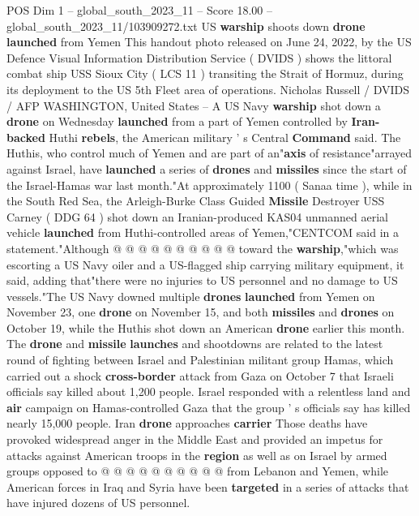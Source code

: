 \begin{textsample}{POS Dim 1 – global\_south\_2023\_11 – Score 18.00 – global\_south\_2023\_11/103909272.txt}  \label{ex:f1_pos_230}
US \textbf{warship} shoots down \textbf{drone} \textbf{launched} from Yemen This handout photo released on June 24, 2022, by the US Defence Visual Information Distribution Service ( DVIDS ) shows the littoral combat ship USS Sioux City ( LCS 11 ) transiting the Strait of Hormuz, during its deployment to the US 5th Fleet area of operations.
Nicholas Russell / DVIDS / AFP WASHINGTON, United States -- A US Navy \textbf{warship} shot down a \textbf{drone} on Wednesday \textbf{launched} from a part of Yemen controlled by \textbf{Iran-backed} Huthi \textbf{rebels}, the American military ' s Central \textbf{Command} said.
The Huthis, who control much of Yemen and are part of an"\textbf{axis} of resistance"arrayed against Israel, have \textbf{launched} a series of \textbf{drones} and \textbf{missiles} since the start of the Israel-Hamas war last month."At approximately 1100 ( Sanaa time ), while in the South Red Sea, the Arleigh-Burke Class Guided \textbf{Missile} Destroyer USS Carney ( DDG 64 ) shot down an Iranian-produced KAS04 unmanned aerial vehicle \textbf{launched} from Huthi-controlled areas of Yemen,"CENTCOM said in a statement."Although @ @ @ @ @ @ @ @ @ @ toward the \textbf{warship},"which was escorting a US Navy oiler and a US-flagged ship carrying military equipment, it said, adding that"there were no injuries to US personnel and no damage to US vessels."The US Navy downed multiple \textbf{drones} \textbf{launched} from Yemen on November 23, one \textbf{drone} on November 15, and both \textbf{missiles} and \textbf{drones} on October 19, while the Huthis shot down an American \textbf{drone} earlier this month.
The \textbf{drone} and \textbf{missile} \textbf{launches} and shootdowns are related to the latest round of fighting between Israel and Palestinian militant group Hamas, which carried out a shock \textbf{cross-border} attack from Gaza on October 7 that Israeli officials say killed about 1,200 people.
Israel responded with a relentless land and \textbf{air} campaign on Hamas-controlled Gaza that the group ' s officials say has killed nearly 15,000 people.
Iran \textbf{drone} approaches \textbf{carrier} Those deaths have provoked widespread anger in the Middle East and provided an impetus for attacks against American troops in the \textbf{region} as well as on Israel by armed groups opposed to @ @ @ @ @ @ @ @ @ @ from Lebanon and Yemen, while American forces in Iraq and Syria have been \textbf{targeted} in a series of attacks that have injured dozens of US personnel.

\end{textsample}

